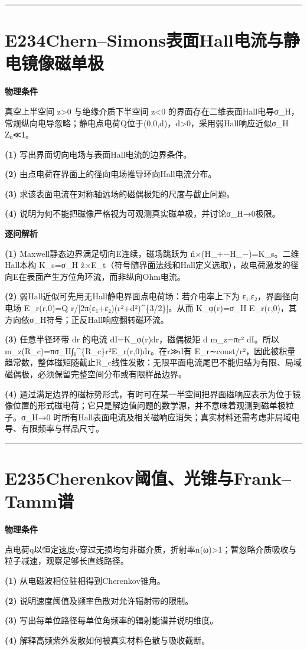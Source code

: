 \documentclass[UTF8,a4paper,11pt,oneside,openany]{ctexbook}
\begin{document}
\par\bigskip\hrule\bigskip
\section*{E234\quad Chern–Simons表面Hall电流与静电镜像磁单极}
\textbf{物理条件}\par 真空上半空间 z>0 与绝缘介质下半空间 z<0 的界面存在二维表面Hall电导σ\_H，常规纵向电导忽略；静电点电荷Q位于(0,0,d)，d>0，采用弱Hall响应近似σ\_H Z₀≪1。
\par\noindent\textbf{(1)} 写出界面切向电场与表面Hall电流的边界条件。
\par\noindent\textbf{(2)} 由点电荷在界面上的径向电场推导环向Hall电流分布。
\par\noindent\textbf{(3)} 求该表面电流在对称轴远场的磁偶极矩的尺度与截止问题。
\par\noindent\textbf{(4)} 说明为何不能把磁像严格视为可观测真实磁单极，并讨论σ\_H→0极限。

\par\medskip\noindent\textbf{逐问解析}
\par\noindent\textbf{(1)} Maxwell静态边界满足切向E连续，磁场跳跃为 n̂×(H\_+−H\_−)=K\_s。二维Hall本构 K\_s=σ\_H ẑ×E\_t（符号随界面法线和Hall定义选取），故电荷激发的径向E在表面产生方位角环流，而非纵向Ohm电流。
\par\noindent\textbf{(2)} 弱Hall近似可先用无Hall静电界面点电荷场：若介电率上下为 ε₁,ε₂，界面径向电场 E\_r(r,0)=Q r/[2π(ε₁+ε₂)(r²+d²)\textasciicircum{}\{3/2\}]。从而 K\_φ(r)=σ\_H E\_r(r,0)，其方向依σ\_H符号；正反Hall响应翻转磁环流。
\par\noindent\textbf{(3)} 任意半径环带 dr 的电流 dI=K\_φ(r)dr，磁偶极矩 d m\_z=πr² dI。所以 m\_z(R\_c)=πσ\_H∫₀\textasciicircum{}\{R\_c\}r²E\_r(r,0)dr。在r≫d有 E\_r∼const/r²，因此被积量趋常数，整体磁矩随截止R\_c线性发散：无限平面电流尾巴不能归结为有限、局域磁偶极，必须保留完整空间分布或有限样品边界。
\par\noindent\textbf{(4)} 通过满足边界的磁标势形式，有时可在某一半空间把界面磁响应表示为位于镜像位置的形式磁电荷；它只是解边值问题的数学源，并不意味着观测到磁单极粒子。σ\_H→0 时所有Hall表面电流及相关磁响应消失；真实材料还需考虑非局域电导、有限频率与样品尺寸。

\par\bigskip\hrule\bigskip
\section*{E235\quad Cherenkov阈值、光锥与Frank–Tamm谱}
\textbf{物理条件}\par 点电荷q以恒定速度v穿过无损均匀非磁介质，折射率n(ω)>1；暂忽略介质吸收与粒子减速，观察足够长直线路径。
\par\noindent\textbf{(1)} 从电磁波相位驻相得到Cherenkov锥角。
\par\noindent\textbf{(2)} 说明速度阈值及频率色散对允许辐射带的限制。
\par\noindent\textbf{(3)} 写出每单位路径每单位角频率的辐射能谱并说明维度。
\par\noindent\textbf{(4)} 解释高频紫外发散如何被真实材料色散与吸收截断。
\end{document}
